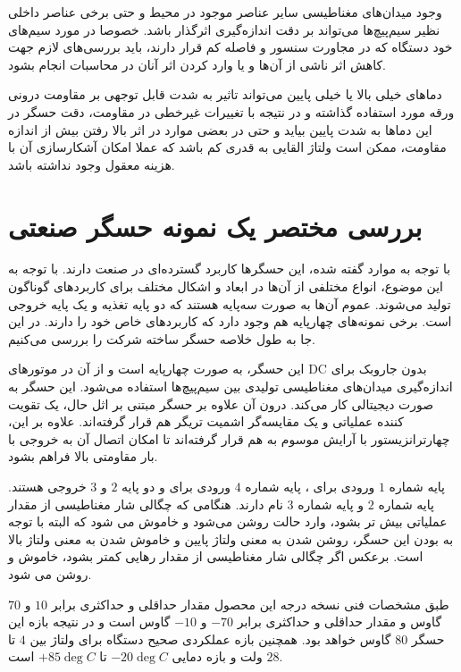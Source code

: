 \documentclass[conference]{IEEEtran-ModifiedForMVIP}
\begin{document}
 وجود میدان‌های مغناطیسی سایر عناصر موجود در محیط و حتی برخی عناصر داخلی نظیر سیم‌پیچ‌ها می‌تواند بر دقت اندازه‌گیری اثرگذار باشد. خصوصا در مورد سیم‌های خود دستگاه که در مجاورت سنسور و فاصله کم قرار دارند، باید بررسی‌های لازم جهت کاهش اثر ناشی از آن‌ها و یا وارد کردن اثر آنان در محاسبات انجام بشود. \cite{ratna}
 
 دماهای خیلی بالا یا خیلی پایین می‌تواند تاثیر به شدت قابل توجهی بر مقاومت درونی ورقه مورد استفاده گذاشته \cite{ratna} و در نتیجه با تغییرات غیرخطی در مقاومت، دقت حسگر در این دماها به شدت پایین بیاید و حتی در بعضی موارد در اثر بالا رفتن بیش از اندازه مقاومت،‌ ممکن است ولتاژ القایی به قدری کم باشد که عملا امکان آشکارسازی آن با هزینه معقول وجود نداشته باشد.
 
\section{بررسی مختصر یک نمونه‌ حسگر  صنعتی}

با توجه به موارد گفته شده، این حسگرها کاربرد گسترده‌ای در صنعت دارند. با توجه به این موضوع، انواع مختلفی از آن‌ها در ابعاد و اشکال مختلف برای کاربردهای گوناگون تولید می‌شوند. عموم آن‌ها به صورت سه‌پایه هستند که دو پایه تغذیه و یک پایه خروجی است. برخی نمونه‌های چهارپایه هم وجود دارد که کاربردهای خاص خود را دارند. در این جا به طول خلاصه حسگر   ساخته شرکت  را بررسی می‌کنیم.

این حسگر، به صورت چهارپایه است و از آن در موتورهای DC بدون جاروبک برای اندازه‌گیری میدان‌های مغناطیسی تولیدی بین سیم‌پیچ‌ها استفاده می‌شود. این حسگر به صورت دیجیتالی کار می‌کند. درون آن علاوه بر حسگر مبتنی بر اثل حال، یک تقویت کننده عملیاتی و یک مقایسه‌گر اشمیت تریگر هم قرار گرفته‌اند. علاوه بر این، چهارترانزیستور  با آرایش موسوم به  هم قرار گرفته‌اند تا امکان اتصال آن به خروجی با بار مقاومتی بالا فراهم بشود. 

پایه شماره $1$ ورودی برای ، پایه شماره $4$ ورودی برای  و دو پایه $2$ و $3$ خروجی هستند. پایه شماره $2$  و پایه شماره $3$  نام دارند. هنگامی که چگالی شار مغناطیسی از مقدار عملیاتی  بیش تر بشود،  وارد حالت روشن می‌شود و  خاموش می شود که البته با توجه به  بودن این حسگر، روشن شدن به معنی ولتاژ پایین و خاموش شدن به معنی ولتاژ بالا است. برعکس اگر چگالی شار مغناطیسی از مقدار رهایی  کمتر بشود،  خاموش و  روشن می شود.

طبق مشخصات فنی نسخه درجه  این محصول مقدار حداقلی و حداکثری  برابر $10$ و $70$ گاوس و مقدار حداقلی و حداکثری  برابر $-70$ و $-10$ گاوس است و در نتیجه بازه  این حسگر $80$ گاوس خواهد بود. همچنین بازه عملکردی صحیح دستگاه برای ولتاژ بین $4$ تا $28$ ولت و بازه دمایی $-20\deg C$ تا $+85\deg C$ است. \cite{ah266}
\end{document}
